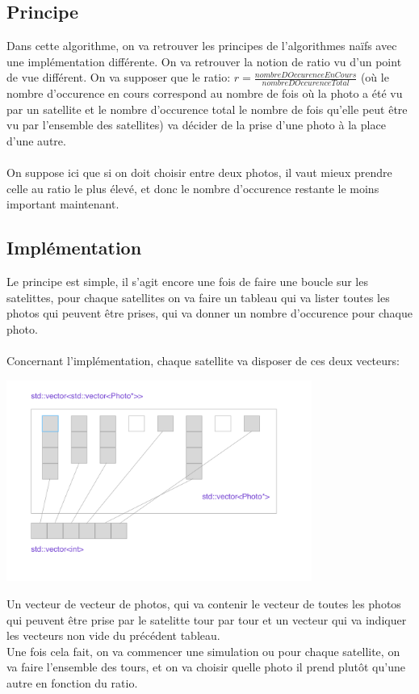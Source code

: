 \documentclass[11pt]{article}
\begin{document}
	\subsection{Principe} %
		\label{sub:principe}
	Dans cette algorithme, on va retrouver les principes de l'algorithmes naïfs avec une implémentation différente. On va retrouver la notion de ratio vu d'un point de vue différent. On va supposer que le ratio: $r=\frac{nombreDOccurenceEnCours}{nombreDOccurenceTotal}$ (où le nombre d'occurence en cours correspond au nombre de fois où la photo a été vu par un satellite et le nombre d'occurence total le nombre de fois qu'elle peut être vu par l'ensemble des satellites) va décider de la prise d'une photo à la place d'une autre.
	\\
	\\
	On suppose ici que si on doit choisir entre deux photos, il vaut mieux prendre celle au ratio le plus élevé, et donc le nombre d'occurence restante le moins important maintenant.

	\subsection{Implémentation} %
		\label{sub:principe}
		Le principe est simple, il s'agit encore une fois de faire une boucle sur les satelittes, pour chaque satellites on va faire un tableau qui va lister toutes les photos qui peuvent être prises, qui va donner un nombre d'occurence pour chaque photo.
		\\
		\\
		Concernant l'implémentation, chaque satellite va disposer de ces deux vecteurs:
		\begin{center}
		\includegraphics [width=100mm]{images/ex1.png} \\[0.5cm]
		\end{center}
		Un vecteur de vecteur de photos, qui va contenir le vecteur de toutes les photos qui peuvent être prise par le satelitte tour par tour et un vecteur qui va indiquer les vecteurs non vide du précédent tableau.
		\\
		Une fois cela fait, on va commencer une simulation ou pour chaque satellite, on va faire l'ensemble des tours, et on va choisir quelle photo il prend plutôt qu'une autre en fonction du ratio.
		
\end{document}
